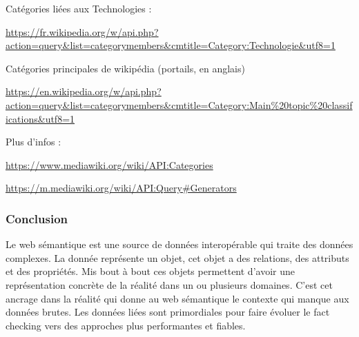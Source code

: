 Catégories liées aux Technologies :

\url{https://fr.wikipedia.org/w/api.php?action=query&list=categorymembers&cmtitle=Category:Technologie&utf8=1}

Catégories principales de wikipédia (portails, en anglais)

\url{https://en.wikipedia.org/w/api.php?action=query&list=categorymembers&cmtitle=Category:Main%20topic%20classifications&utf8=1}

Plus d'infos : 

\url{https://www.mediawiki.org/wiki/API:Categories}

\url{https://m.mediawiki.org/wiki/API:Query#Generators}
\fi

\subsubsection{Conclusion}

Le web sémantique est une source de données interopérable qui traite des données complexes. La donnée représente un objet, cet objet a des relations, des attributs et des propriétés. Mis bout à bout ces objets permettent d'avoir une représentation concrète de la réalité dans un ou plusieurs domaines. C'est cet ancrage dans la réalité qui donne au web sémantique le contexte qui manque aux données brutes. Les données liées sont primordiales pour faire évoluer le fact checking vers des approches plus performantes et fiables.